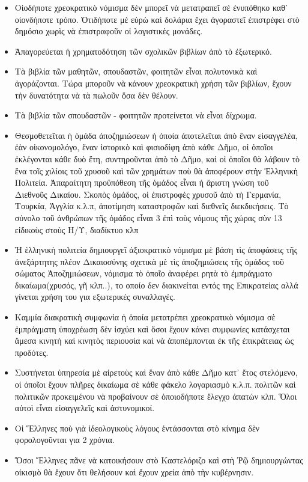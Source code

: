 \documentclass[a4paper]{article}
\begin{document}
\begin{itemize}
\item Οἱοδήποτε χρεοκρατικὸ νόμισμα δὲν μπορεῖ νὰ μετατραπεῖ σὲ ἐνυπόθηκο καθ᾿ οἱονδήποτε τρόπο. Ὁτιδήποτε μὲ εὐρὼ καὶ δολάρια ἔχει ἀγοραστεῖ ἐπιστρέφει στὸ δημόσιο χωρὶς νὰ ἐπιστραφοῦν οἱ λογιστικὲς μονάδες.
\item Ἀπαγορεύεται ἡ χρηματοδότηση τῶν σχολικῶν βιβλίων ἀπὸ τὸ ἐξωτερικό.
\item Τὰ βιβλία τῶν μαθητῶν, σπουδαστῶν, φοιτητῶν εἶναι πολυτονικὰ καὶ ἀγοράζονται. Τώρα μποροῦν νὰ κάνουν χρεοκρατικὴ χρήση τῶν βιβλίων, ἔχουν τὴν δυνατότητα νὰ τὰ πωλοῦν ὅσα δὲν θέλουν.
\item Τὰ βιβλία τῶν σπουδαστῶν - φοιτητῶν προτείνεται νὰ εἶναι δίχρωμα.
\item Θεσμοθετεῖται ἡ ὁμάδα ἀποζημιώσεων ἡ ὁποία ἀποτελεῖται ἀπὸ ἕναν εἰσαγγελέα, ἐὰν οἰκονομολόγο, ἕναν ἱστορικὸ καὶ φισιοδίφη ἀπὸ κάθε Δῆμο, οἱ ὁποῖοι ἐκλέγονται κάθε δυὸ ἔτη, συντηροῦνται ἀπὸ τὸ Δῆμο, καὶ οἱ ὁποῖοι θὰ λάβουν τὸ ἕνα τοῖς χιλίοις τοῦ χρυσοῦ καὶ τῶν χρημάτων ποὺ θὰ ἀποφέρουν στὴν Ἑλληνικὴ Πολιτεία. Ἀπαραίτητη προϋπόθεση τῆς ὁμάδος εἶναι ἡ ἄριστη γνώση τοῦ Διεθνοῦς Δικαίου. Σκοπὸς ὁμάδος, οἱ ἐπιστροφὲς χρυσοῦ ἀπὸ τὴ Γερμανία, Τουρκία, Ἀγγλία κ.λ.π, ἀποτίμηση καταστροφῶν καὶ διεθνεῖς διεκδικήσεις. Τὸ σύνολο τοῦ ἀνθρώπων τῆς ὁμάδος εἶναι 3 ἐπὶ τοὺς νόμους τῆς χώρας σὺν 13 εἰδικοὺς στοὺς Η/Υ, διαδίκτυο κλπ
\item Ἡ ἑλληνικὴ πολιτεία δημιουργεῖ ἀξιοκρατικὸ νόμισμα μὲ βάση τὶς ἀποφάσεις τῆς ἀνεξάρτητης πλέον Δικαιοσύνης σχετικὰ μὲ τὶς ἀποζημιώσεις τῆς ὁμάδος τοῦ σώματος Ἀποζημιώσεων, νόμισμα τὸ ὁποῖο ἀναφέρει ρητὰ τὸ ἐμπράγματο δικαίωμα(χρυσός, γῆ κλπ..), το οποίο δεν διακινείται εντός της Επικρατείας αλλά γίνεται χρήση του για εξωτερικές συναλλαγές.
\item Καμμία διακρατικὴ συμφωνία ἡ ὁποία μετατρέπει χρεοκρατικὸ νόμισμα σὲ ἐμπράγματη ὑποχρέωση δὲν ἰσχύει καὶ ὅσοι ἔχουν κάνει συμφωνίες κατάσχεται ἄμεσα κινητὴ καὶ κινητὸς περιουσία καὶ νὰ ἀποπέμπονται ἐκ τῆς ἐπικράτειας ὡς προδότες.
\item Συστήνεται ὑπηρεσία μὲ αἱρετοὺς καὶ ἕναν ἀπὸ κάθε Δῆμο κατ᾿ ἔτος στελόμενο, οἱ ὁποῖοι ἔχουν πλῆρες δικαίωμα σὲ κάθε φάκελο λογαριασμὸ κ.λ.π. πολιτῶν καὶ πολιτικῶν προκειμένου νὰ προβαίνουν σὲ ὁποιοδήποτε ἔλεγχο ἀπατών κλπ. Ὅλοι αὐτοὶ εἶναι εἰσαγγελεῖς καὶ ἀστυνομικοί.
\item Οἱ Ἕλληνες ποὺ γιὰ ἱδεολογικοὺς λόγους ἑντάσσονται στὸ κίνημα δὲν φορολογοῦνται για 2 χρόνια.
\item Ὅσοι Ἕλληνες πᾶνε νὰ κατοικήσουν στὸ Καστελόριζο καὶ στὴ Ῥῷ δημιουργώντας οἰκισμὸ θὰ ἔχουν ὅτι θελήσουν καὶ ἔχουν χρεία ἀπὸ τὴν κυβέρνησιν.

\end{itemize}
\end{document}
